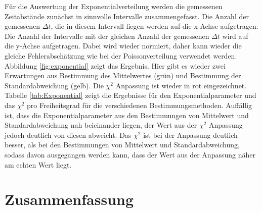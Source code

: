 \documentclass[12pt,a4paper]{article}
\begin{document}
Für die Auswertung der Exponentialverteilung werden die gemessenen Zeitabstände zunächst in sinnvolle Intervalle zusammengefasst. Die Anzahl der gemessenen $\Delta t$, die in diesem Intervall liegen werden auf die x-Achse aufgetragen. Die Anzahl der Intervalle mit der gleichen Anzahl der gemessenen $\Delta t$ wird auf die y-Achse aufgetragen. Dabei wird wieder normiert, daher kann wieder die gleiche Fehlerabschätzung wie bei der Poissonverteilung verwendet werden. Abbildung \ref{fig:exponential} zeigt das Ergebnis. Hier gibt es wieder zwei Erwartungen aus Bestimmung des Mittelwertes (grün) und Bestimmung der Standardabweichung (gelb). Die $\chi ^2$ Anpassung ist wieder in rot eingezeichnet.\\
Tabelle \ref{tab:Exponential} zeigt die Ergebnisse für den Exponentialparameter und das $\chi ^2$ pro Freiheitsgrad für die verschiedenen Bestimmungsmethoden. Auffällig ist, dass die Exponentialparameter aus den Bestimmungen von Mittelwert und Standardabweichung nah beieinander liegen, der Wert aus der $\chi ^2$ Anpassung jedoch deutlich von diesen abweicht. Das $\chi ^2$ ist bei der Anpassung deutlich besser, als bei den Bestimmungen von Mittelwert und Standardabweichung, sodass davon ausgegangen werden kann, dass der Wert aus der Anpassung näher am echten Wert liegt.

\section{Zusammenfassung}
\end{document}
